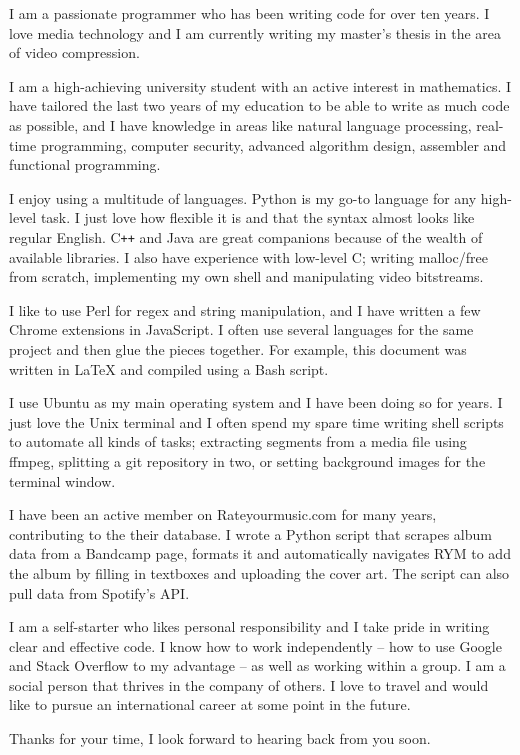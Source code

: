 I am a passionate programmer who has been writing code for over ten years. I love media technology and I am currently writing my master's thesis in the area of video compression.

I am a high-achieving university student with an active interest in mathematics. I have tailored the last two years of my education to be able to write as much code as possible, and I have knowledge in areas like natural language processing, real-time programming, computer security, advanced algorithm design, assembler and functional programming.

I enjoy using a multitude of languages. Python is my go-to language for any high-level task. I just love how flexible it is and that the syntax almost looks like regular English. C\texttt{++} and Java are great companions because of the wealth of available libraries. I also have experience with low-level C; writing malloc/free from scratch, implementing my own shell and manipulating video bitstreams.

I like to use Perl for regex and string manipulation, and I have written a few Chrome extensions in JavaScript. I often use several languages for the same project and then glue the pieces together. For example, this document was written in LaTeX and compiled using a Bash script.

I use Ubuntu as my main operating system and I have been doing so for years. I just love the Unix terminal and I often spend my spare time writing shell scripts to automate all kinds of tasks; extracting segments from a media file using ffmpeg, splitting a git repository in two, or setting background images for the terminal window.

I have been an active member on Rateyourmusic.com for many years, contributing to the their database. I wrote a Python script that scrapes album data from a Bandcamp page, formats it and automatically navigates RYM to add the album by filling in textboxes and uploading the cover art. The script can also pull data from Spotify's API.

I am a self-starter who likes personal responsibility and I take pride in writing clear and effective code. I know how to work independently -- how to use Google and Stack Overflow to my advantage -- as well as working within a group. I am a social person that thrives in the company of others. I love to travel and would like to pursue an international career at some point in the future.

Thanks for your time, I look forward to hearing back from you soon.